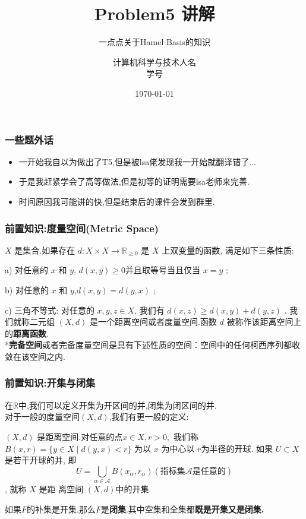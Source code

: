 \documentclass[12pt,aspectratio=169,mathserif]{beamer}
\title{Problem5 讲解}	%
\subtitle{一点点关于Hamel Basis的知识}
\author[人名]{                         %
    计算机科学与技术\quad 人名\\
  {\small 学号\\
   }}
\date{\today}                                                 %
\begin{document}
\maketitle
\begin{frame}
	\frametitle{一些题外话}
	\begin{itemize}
	\item	一开始我自以为做出了T5,但是被lsa佬发现我一开始就翻译错了...
	\pause
	
	
\item	于是我赶紧学会了高等做法,但是初等的证明需要lsa老师来完善.
	
	\pause
	
	\item 时间原因我可能讲的快,但是结束后的课件会发到群里.
	\end{itemize}
	
\end{frame}
\begin{frame}
\frametitle{前置知识:度量空间(Metric Space)}
	\begin{definition}[度量空间]
	$X $ 是集合.如果存在  $d: X \times X \rightarrow \mathbb{R}_{\geqslant 0}$  是 $ X$  上双变量的函数, 满足如下三条性质:
	
		a) 对任意的 $ x $ 和 $ y$, $d(x, y) \geqslant 0  $并且取等号当且仅当  $x=y$ ;
	
		b) 对任意的  $x $ 和 $ y$,$ d(x, y)=d(y, x)$ ;
	
		c) 三角不等式: 对任意的 $ x, y, z \in X $, 我们有 $ d(x, z) \geqslant d(x, y)+d(y, z)$  .
		我们就称二元组 $ (X, d)$  是一个距离空间或者度量空间.函数  $d $ 被称作该距离空间上的\textbf{距离函数}.
		\pause\\
		*\textbf{完备空间}或者完备度量空间是具有下述性质的空间：空间中的任何柯西序列都收敛在该空间之内.
	\end{definition} 
\end{frame}
\begin{frame}
	\frametitle{前置知识:开集与闭集}
	在$\mathbb{R}$中,我们可以定义开集为开区间的并,闭集为闭区间的并.\pause \\
	对于一般的度量空间$(X,d)$,我们有更一般的定义:\pause
	
	\begin{definition}
		$(X, d)$  是距离空间.对任意的点$  x \in X, r>0 ,$ 我们称  $B(x, r)=\{y \in X \mid d(y, x)<r\} $ 为以 $ x $ 为中心以 $ r  $为半径的开球.
		如果  $U \subset X$  是若干开球的并, 即 $$ U=\bigcup_{\alpha \in \mathcal{A}} B\left(x_{\alpha}, r_{\alpha}\right)  (\text{指标集}  \mathcal{A}  \text{是任意的})$$, 就称 $ X$  是距 离空间 $ (X, d)  $中的开集.
	\end{definition}
	\pause
	如果$F$的补集是开集,那么$F$是\textbf{闭集}.其中空集和全集都\textbf{既是开集又是闭集.}
\end{frame}
\end{document}
